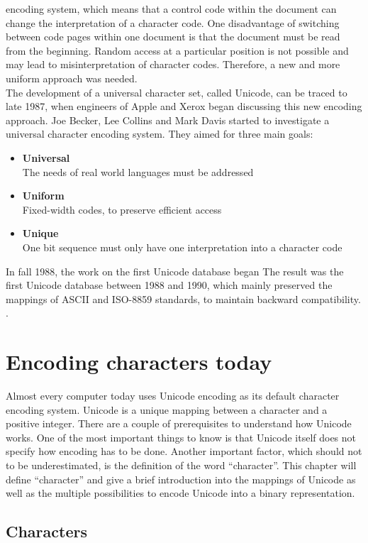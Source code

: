 \documentclass[a4paper, 12pt]{scrartcl} %
\begin{document}
encoding system, which means that a control code within the document can change
the interpretation of a character code. One disadvantage of switching between
code pages within one document is that the document must be read from the
beginning. Random access at a particular position is not possible and may
lead to misinterpretation of character codes. Therefore, a new and more uniform
approach was needed. \\
The development of a universal character set, called Unicode, can be traced
to late 1987, when engineers of Apple and Xerox began discussing this new
encoding approach. Joe Becker, Lee Collins and Mark Davis started to
investigate a universal character encoding system. They aimed for three main goals:
\begin{itemize}
  \item{\textbf{Universal}} \\
    The needs of real world languages must be addressed
  \item{\textbf{Uniform}} \\
    Fixed-width codes, to preserve efficient access
  \item{\textbf{Unique}} \\
    One bit sequence must only have one interpretation into a character code
\end{itemize}
In fall 1988, the work on the first Unicode database began The result was the
first Unicode database between 1988 and 1990, which mainly preserved the
mappings of \gls{ASCII} and \gls{ISO-8859} standards, to maintain backward
compatibility. \cite{summarynarrative}.

\section{Encoding characters today}

Almost every computer today uses Unicode encoding as its default character
encoding system. Unicode is a unique mapping between a character and a positive
integer. There are a couple of prerequisites to understand how
Unicode works. One of the most important things to know is that Unicode itself
does not specify how encoding has to be done. Another important factor, which
should not to be underestimated, is the definition of the word ``character''.
This chapter will define ``character'' and give a brief introduction into the
mappings of Unicode as well as the multiple possibilities to encode Unicode
into a binary representation.

\subsection{Characters}
\end{document}
